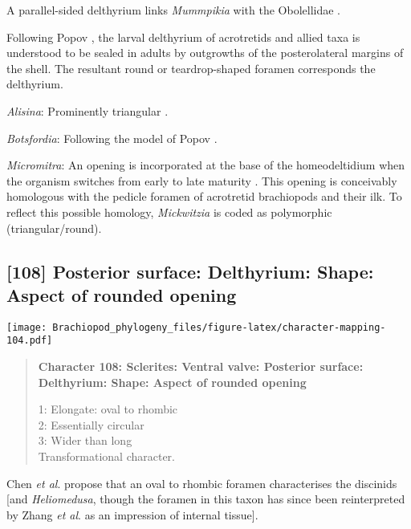 \documentclass[openany]{book}
\theoremstyle{definition}
\theoremstyle{definition}
\theoremstyle{definition}
\theoremstyle{remark}
\begin{document}
A parallel-sided delthyrium links \emph{Mummpikia} with the Obolellidae
\citep{Balthasar2008iMummpikia}.

Following Popov \citeyearpar{Popov1992TheCambrian}, the larval
delthyrium of acrotretids and allied taxa is understood to be sealed in
adults by outgrowths of the posterolateral margins of the shell. The
resultant round or teardrop-shaped foramen corresponds the delthyrium.

\hypertarget{Alisina-coding-107}{}
\emph{Alisina}: Prominently triangular \citep[see][fig.
2]{Topper2013Theoldest}.

\hypertarget{Botsfordia-coding-107}{}
\emph{Botsfordia}: Following the model of Popov
\citeyearpar{Popov1992TheCambrian}.

\hypertarget{Micromitra-coding-107}{}
\emph{Micromitra}: An opening is incorporated at the base of the
homeodeltidium when the organism switches from early to late maturity
\citep[fig. 10 in][]{Balthasar2004Shellstructure}. This opening is
conceivably homologous with the pedicle foramen of acrotretid
brachiopods and their ilk. To reflect this possible homology,
\emph{Mickwitzia} is coded as polymorphic (triangular/round).

\subsection*{{[}108{]} Posterior surface: Delthyrium: Shape: Aspect of
rounded
opening}\label{posterior-surface-delthyrium-shape-aspect-of-rounded-opening}

\texttt{[image: Brachiopod\_phylogeny\_files/figure-latex/character-mapping-104.pdf]}

\begin{quote}
\textbf{Character 108: Sclerites: Ventral valve: Posterior surface:
Delthyrium: Shape: Aspect of rounded opening}

1: Elongate: oval to rhombic\\
2: Essentially circular\\
3: Wider than long\\
Transformational character.
\end{quote}

Chen \emph{et al}. \citeyearpar{Chen2007Reinterpretationof} propose that
an oval to rhombic foramen characterises the discinids {[}and
\emph{Heliomedusa}, though the foramen in this taxon has since been
reinterpreted by Zhang \emph{et al}.
\citeyearpar{Zhang2009Architectureand} as an impression of internal
tissue{]}.
\end{document}
